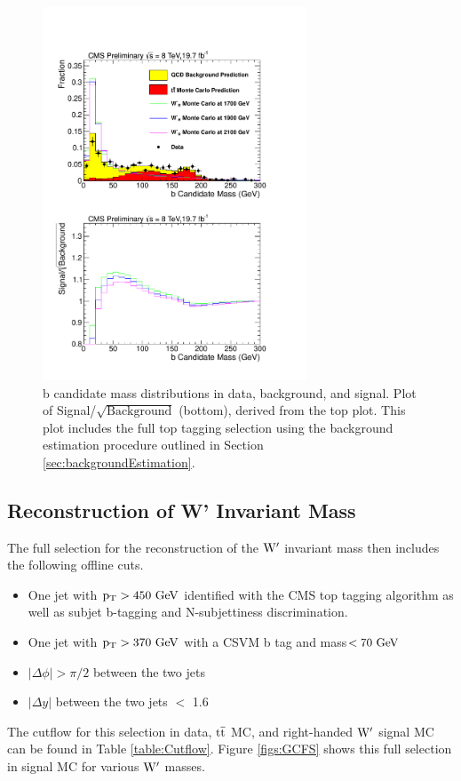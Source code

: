 \begin{figure}[htcb]
\begin{center}
\includegraphics[width=0.7\textwidth]{AN-13-004/figs/bmassdatatosigwithdata.pdf}
\caption{
b candidate mass distributions in data, background, and signal.  Plot of Signal/$\sqrt{\text{Background}}$ (bottom), derived from the top plot. 
This plot includes the full top tagging selection using the background estimation procedure outlined in Section \ref{sec:backgroundEstimation}.
}
\label{figs:BmassCOMP}
\end{center}
\end{figure}


\subsection{Reconstruction of W' Invariant Mass}
\label{sec:fullselection}
The full selection for the reconstruction of the $\mathrm{W}^\prime$ invariant mass then includes the following offline cuts.
\begin{itemize}
\item One jet with $\mathrm{p_{T}} > 450~\mathrm{GeV}$ identified with the CMS top tagging algorithm as well as subjet b-tagging and N-subjettiness discrimination.
\item One jet with $\mathrm{p_{T}} > 370~\mathrm{GeV}$ with a CSVM b tag and mass$ < 70~\mathrm{GeV}$
\item $|\Delta \phi| > \pi/2$ between the two jets
\item $|\Delta y|$ between the two jets $<$ 1.6 
\end{itemize}
The cutflow for this selection in data, $\mathrm{t\overline{t}}$ MC, and right-handed $\mathrm{W}^\prime$ signal MC can be found in Table \ref{table:Cutflow}.
Figure \ref{figs:GCFS} shows this full selection in signal MC for various $\mathrm{W}^\prime$ masses.  



